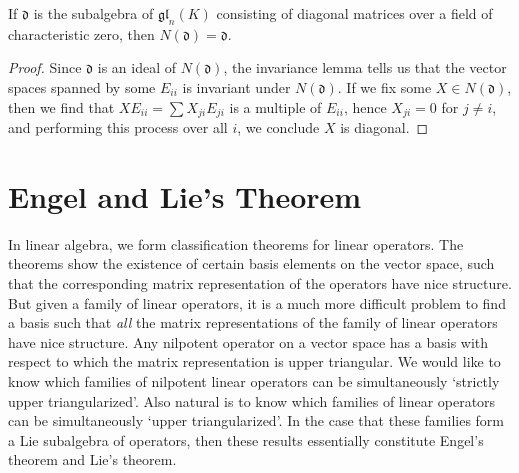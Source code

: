 \begin{theorem}
    If $\mathfrak{d}$ is the subalgebra of $\mathfrak{gl}_n(K)$ consisting of diagonal matrices over a field of characteristic zero, then $N(\mathfrak{d}) = \mathfrak{d}$.
\end{theorem}
\begin{proof}
    Since $\mathfrak{d}$ is an ideal of $N(\mathfrak{d})$, the invariance lemma tells us that the vector spaces spanned by some $E_{ii}$ is invariant under $N(\mathfrak{d})$. If we fix some $X \in N(\mathfrak{d})$, then we find that $XE_{ii} = \sum X_{ji} E_{ji}$ is a multiple of $E_{ii}$, hence $X_{ji} = 0$ for $j \neq i$, and performing this process over all $i$, we conclude $X$ is diagonal.
\end{proof}

\section{Engel and Lie's Theorem}

In linear algebra, we form classification theorems for linear operators. The theorems show the existence of certain basis elements on the vector space, such that the corresponding matrix representation of the operators have nice structure. But given a family of linear operators, it is a much more difficult problem to find a basis such that {\it all} the matrix representations of the family of linear operators have nice structure. Any nilpotent operator on a vector space has a basis with respect to which the matrix representation is upper triangular. We would like to know which families of nilpotent linear operators can be simultaneously `strictly upper triangularized'. Also natural is to know which families of linear operators can be simultaneously `upper triangularized'. In the case that these families form a Lie subalgebra of operators, then these results essentially constitute Engel's theorem and Lie's theorem.

